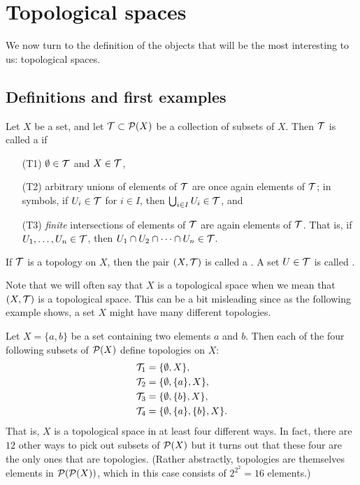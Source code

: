 \section{Topological spaces}
\label{topological-spaces}
We now turn to the definition of the objects that will be the most interesting to us: topological spaces.

\subsection{Definitions and first examples}
\begin{defn}
  Let $X$ be a set, and let $\mathcal{T} \subset \mathcal{P}(X)$ be a collection of subsets of $X$. Then $\mathcal{T}$ is called a  if
  \begin{enumerate}
    \item[(T1)] $\emptyset \in \mathcal{T}$ and $X \in \mathcal{T}$,
    \item[(T2)] arbitrary unions of elements of $\mathcal{T}$ are once again elements of $\mathcal{T}$; in symbols, if $U_i \in \mathcal{T}$ for $i \in I$, then $\bigcup_{i \in I} U_i \in \mathcal{T}$, and
    \item[(T3)] \emph{finite} intersections of elements of $\mathcal{T}$ are again elements of $\mathcal{T}$. That is, if $U_1, \dots, U_n \in \mathcal{T}$, then $U_1 \cap U_2 \cap \dots \cap U_n \in \mathcal{T}$.
  \end{enumerate}
  If $\mathcal{T}$ is a topology on $X$, then the pair $(X,\mathcal{T})$ is called a . A set $U \in \mathcal{T}$ is called .
\end{defn}
Note that we will often say that $X$ is a topological space when we mean that $(X,\mathcal{T})$ is a topological space. This can be a bit misleading since as the following example shows, a set $X$ might have many different topologies.
\begin{example}
  \label{two-point-topologies}
  Let $X = \{a,b\}$ be a set containing two elements $a$ and $b$. Then each of the four following subsets of $\mathcal{P}(X)$ define topologies on $X$:
  \begin{align*}
    \mathcal{T}_1 &= \{\emptyset,X\},\\
    \mathcal{T}_2 &= \{\emptyset, \{a\}, X\},\\
    \mathcal{T}_3 &= \{\emptyset, \{b\}, X\}, \\
    \mathcal{T}_4 &= \{\emptyset,\{a\},\{b\},X\}.
  \end{align*}
  That is, $X$ is a topological space in at least four different ways. In fact, there are $12$ other ways to pick out subsets of $\mathcal{P}(X)$ but it turns out that these four are the only ones that are topologies. (Rather abstractly, topologies are themselves elements in $\mathcal{P}(\mathcal{P}(X))$, which in this case consists of $2^{2^2} = 16$ elements.)
\end{example}
